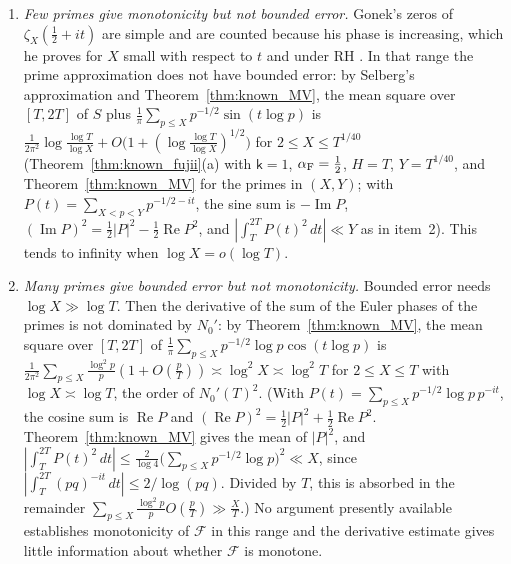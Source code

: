 \documentclass[11pt,a4paper]{article}
\makeatletter
\numberwithin{equation}{section}
\DeclareRobustCommand{\CGref}[1]{\ref{#1}}
\DeclareRobustCommand{\CGcite}[2][]{\if\relax\detokenize{#1}\relax\cite{#2}\else\cite[#1]{#2}\fi}
\let\CG@origref\ref
\newcommand{\CG@gettip}[1]{\@ifundefined{CGTip@#1}{#1}{\csname CGTip@#1\endcsname}}
\newcommand{\CG@getbib}[1]{\@ifundefined{CGBib@#1}{#1}{\csname CGBib@#1\endcsname}}
\DeclareRobustCommand{\CGref}[1]{\pdftooltip{\CG@origref{#1}}{\CG@gettip{#1}}}
\DeclareRobustCommand{\CGcite}[2][]{\pdftooltip{\if\relax\detokenize{#1}\relax\cite{#2}\else\cite[#1]{#2}\fi}{\CG@getbib{#2}}}
\theoremstyle{definition}
\theoremstyle{remark}
\newcommand{\Nz}{N_0} %
\newcommand{\Fc}{\mathcal F}
\makeatother
\begin{document}
\begin{enumerate}
\item \emph{Few primes give monotonicity but not bounded error.} Gonek's zeros of $\zeta_X(\frac12+it)$ are simple and are counted because his phase is increasing, which he proves for $X$ small with respect to $t$ and under RH \CGcite[Thm.~8.1 and \S10]{Gonek2012}. In that range the prime approximation does not have bounded error: by Selberg's approximation \CGcite[\S3]{Fujii1974} and Theorem~\CGref{thm:known_MV}, the mean square over $[T,2T]$ of $S$ plus $\frac1\pi\sum_{p\le X}p^{-1/2}\sin(t\log p)$ is $\frac1{2\pi^2}\log\frac{\log T}{\log X}+O\bigl(1+(\log\frac{\log T}{\log X})^{1/2}\bigr)$ for $2\le X\le T^{1/40}$ (Theorem~\CGref{thm:known_fujii}(a) with $\mathsf k=1$, $\alpha_{\rm F}=\frac12$, $H=T$, $Y=T^{1/40}$, and Theorem~\CGref{thm:known_MV} for the primes in $(X,Y)$; with $P(t)=\sum_{X<p<Y}p^{-1/2-it}$, the sine sum is $-\operatorname{Im}P$, $(\operatorname{Im}P)^2=\frac12|P|^2-\frac12\operatorname{Re}P^2$, and $|\int_T^{2T}P(t)^2\,dt|\ll Y$ as in item~2). This tends to infinity when $\log X=o(\log T)$.
\item \emph{Many primes give bounded error but not monotonicity.} Bounded error needs $\log X\gg\log T$. Then the derivative of the sum of the Euler phases of the primes is not dominated by $\Nz'$: by Theorem~\CGref{thm:known_MV}, the mean square over $[T,2T]$ of $\frac1\pi\sum_{p\le X}p^{-1/2}\log p\cos(t\log p)$ is $\frac{1}{2\pi^2}\sum_{p\le X}\frac{\log^2p}{p}(1+O(\frac{p}{T}))\asymp\log^2X\asymp\log^2T$ for $2\le X\le T$ with $\log X\asymp\log T$, the order of $\Nz'(T)^2$. (With $P(t)=\sum_{p\le X}p^{-1/2}\log p\,p^{-it}$, the cosine sum is $\operatorname{Re}P$ and $(\operatorname{Re}P)^2=\frac12|P|^2+\frac12\operatorname{Re}P^2$. Theorem~\CGref{thm:known_MV} gives the mean of $|P|^2$, and $|\int_T^{2T}P(t)^2\,dt|\le\frac2{\log4}\bigl(\sum_{p\le X}p^{-1/2}\log p\bigr)^2\ll X$, since $|\int_T^{2T}(pq)^{-it}\,dt|\le2/\log(pq)$. Divided by $T$, this is absorbed in the remainder $\sum_{p\le X}\frac{\log^2p}{p}O(\frac pT)\gg\frac XT$.) No argument presently available establishes monotonicity of $\Fc$ in this range and the derivative estimate gives little information about whether $\Fc$ is monotone.
\end{enumerate}
\end{document}
